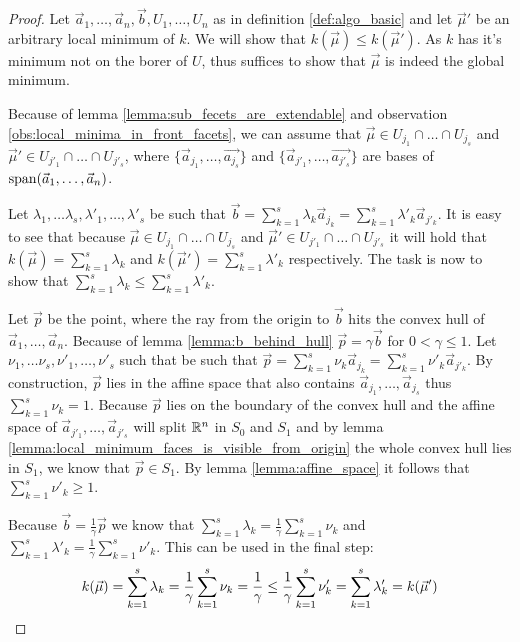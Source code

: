 \begin{proof}
    Let $\vec a_1, \dots, \vec a_n, \vec b, U_1, \dots, U_n$ as in definition \ref{def:algo_basic} and let $\vec\mu'$ be an arbitrary local minimum of $k$. We will show that $k(\vec\mu) \leq k(\vec\mu')$. As $k$ has it's minimum not on the borer of $U$, thus suffices to show that $\vec\mu$ is indeed the global minimum.

    Because of lemma \ref{lemma:sub_fecets_are_extendable} and observation \ref{obs:local_minima_in_front_facets}, we can assume that $\vec\mu \in U_{j_1} \cap \dots \cap U_{j_s}$ and $\vec\mu' \in U_{j'_1} \cap \dots \cap U_{j'_s}$, where $\{\vec a_{j_1}, \dots, \vec {a_{j_s}}\}$ and $\{\vec a_{j'_1}, \dots, \vec {a_{j'_s}}\}$ are bases of $\operatorname{span}(\vec a_1, \dots, \vec a_n)$.
    
    Let $\lambda_1, \dots \lambda_s, \lambda'_1, \dots, \lambda'_s$ be such that $\vec b = \sum_{k=1}^{s}\lambda_k \vec a_{j_k} = \sum_{k=1}^{s}\lambda'_k \vec a_{j'_k}$. It is easy to see that because $\vec\mu \in U_{j_1} \cap \dots \cap U_{j_s}$ and $\vec\mu' \in U_{j'_1} \cap \dots \cap U_{j'_s}$ it will hold that $k(\vec\mu) = \sum_{k=1}^{s}\lambda_k$ and $k(\vec\mu') = \sum_{k=1}^{s}\lambda'_k$ respectively. The task is now to show that $\sum_{k=1}^{s}\lambda_k \leq \sum_{k=1}^{s}\lambda'_k$.

    Let $\vec p$ be the point, where the ray from the origin to $\vec b$ hits the convex hull of $\vec a_1, \dots, \vec a_n$. Because of lemma \ref{lemma:b_behind_hull} $\vec p = \gamma\vec b$ for $0 < \gamma \leq 1$. Let $\nu_1, \dots \nu_s, \nu'_1, \dots, \nu'_s$ such that be such that $\vec p = \sum_{k=1}^{s}\nu_k \vec a_{j_k} = \sum_{k=1}^{s}\nu'_k \vec a_{j'_k}$. By construction, $\vec p$ lies in the affine space that also contains $\vec a_{j_1}, \dots, \vec a_{j_s}$ thus $\sum_{k=1}^{s}\nu_k = 1$. Because $\vec p$ lies on the boundary of the convex hull and the affine space of $\vec a_{j'_1}, \dots, \vec a_{j'_s}$ will split $\mathbb{R}^n$ in $S_0$ and $S_1$ and by lemma \ref{lemma:local_minimum_faces_is_visible_from_origin} the whole convex hull lies in $S_1$, we know that $\vec p\in S_1$. By lemma \ref{lemma:affine_space} it follows that $\sum_{k=1}^{s}\nu'_k \geq 1$.

    Because $\vec b = \frac{1}{\gamma}\vec p$ we know that $\sum_{k=1}^{s}\lambda_k = \frac{1}{\gamma} \sum_{k=1}^{s}\nu_k$ and $\sum_{k=1}^{s}\lambda'_k = \frac{1}{\gamma} \sum_{k=1}^{s}\nu'_k$. This can be used in the final step:
    \begin{equation*}
        k(\vec\mu) = \sum_{k=1}^{s}\lambda_k = \frac{1}{\gamma} \sum_{k=1}^{s}\nu_k = \frac{1}{\gamma} \leq \frac{1}{\gamma} \sum_{k=1}^{s}\nu'_k = \sum_{k=1}^{s}\lambda'_k = k(\vec\mu') \qedhere
    \end{equation*}
\end{proof}


